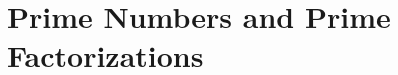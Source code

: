 \section{Prime Numbers and Prime Factorizations} \label{S:primefactorizations}
\setcounter{previewactivity}{0}
%


%






%

%


%

%
%
%


\endinput
